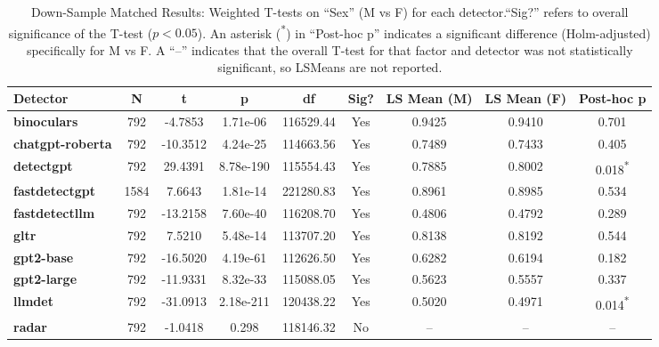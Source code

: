 \begin{table*}[ht!]
\centering
\small
\begin{tabular}{lcccccccc}
\toprule
\textbf{Detector} & \textbf{N} & \textbf{t} & \textbf{p} & \textbf{df} 
& \textbf{Sig?} & \textbf{LS Mean (M)} & \textbf{LS Mean (F)} 
& \textbf{Post-hoc p} \\
\midrule
\textbf{binoculars}      &  792 & -4.7853  & 1.71e-06   & 116529.44 & Yes & 0.9425 & 0.9410 & 0.701  \\
\textbf{chatgpt-roberta} &  792 & -10.3512 & 4.24e-25   & 114663.56 & Yes & 0.7489 & 0.7433 & 0.405  \\
\textbf{detectgpt}       &  792 & 29.4391  & 8.78e-190  & 115554.43 & Yes & 0.7885 & 0.8002 & 0.018\textsuperscript{*} \\
\textbf{fastdetectgpt}   & 1584 & 7.6643   & 1.81e-14   & 221280.83 & Yes & 0.8961 & 0.8985 & 0.534  \\
\textbf{fastdetectllm}   &  792 & -13.2158 & 7.60e-40   & 116208.70 & Yes & 0.4806 & 0.4792 & 0.289  \\
\textbf{gltr}            &  792 & 7.5210   & 5.48e-14   & 113707.20 & Yes & 0.8138 & 0.8192 & 0.544  \\
\textbf{gpt2-base}       &  792 & -16.5020 & 4.19e-61   & 112626.50 & Yes & 0.6282 & 0.6194 & 0.182  \\
\textbf{gpt2-large}      &  792 & -11.9331 & 8.32e-33   & 115088.05 & Yes & 0.5623 & 0.5557 & 0.337  \\
\textbf{llmdet}          &  792 & -31.0913 & 2.18e-211  & 120438.22 & Yes & 0.5020 & 0.4971 & 0.014\textsuperscript{*} \\
\textbf{radar}           &  792 & -1.0418  & 0.298      & 118146.32 & No  &  --    &  --    &  --    \\
\bottomrule
\end{tabular}
\caption{Down-Sample Matched Results: Weighted T-tests on ``Sex'' (M vs F) for each detector.“Sig?” refers to overall significance of the T-test ($p<0.05$). An asterisk (\textsuperscript{*}) in “Post-hoc p” indicates a significant difference (Holm-adjusted) specifically for M vs F. A ``--'' indicates that the overall T-test for that factor and detector was not statistically significant, so LSMeans are not reported.}
\label{tab:sex-test}
\end{table*}






